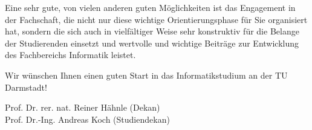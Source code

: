 {    Eine sehr gute, von vielen anderen guten Möglichkeiten ist das Engagement in der Fachschaft, die nicht nur diese wichtige Orientierungsphase für Sie organisiert hat, sondern die sich auch in vielfältiger Weise sehr konstruktiv für die Belange der Studierenden einsetzt und wertvolle und wichtige Beiträge zur Entwicklung des Fachbereichs Informatik leistet.

    Wir wünschen Ihnen einen guten Start in das Informatikstudium an der TU Darmstadt!
}
{Prof. Dr. rer. nat. Reiner Hähnle (Dekan) \\Prof. Dr.-Ing. Andreas Koch (Studiendekan)}

\newpage
